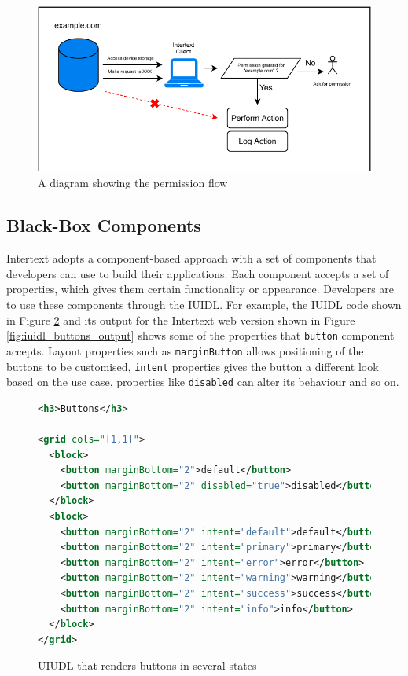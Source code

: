 \begin{figure}
  \centering
  \includegraphics[width=13cm]{thesis/paper/images/permission.pdf}
  \caption{A diagram showing the permission flow}%
  \label{fig:permission_flow}%
\end{figure}


\subsection{Black-Box Components}

Intertext adopts a component-based approach with a set of components that developers can use to build their applications. Each component accepts a set of properties, which gives them certain functionality or appearance. Developers are to use these components through the IUIDL. For example, the IUIDL code shown in Figure \ref{fig:iuidl_buttons} and its output for the Intertext web version shown in Figure \ref{fig:iuidl_buttons_output} shows some of the properties that \texttt{button} component accepts. Layout properties such as  \texttt{marginButton} allows positioning of the buttons to be customised, \texttt{intent} properties gives the button a different look based on the use case, properties like \texttt{disabled} can alter its behaviour and so on.

\begin{figure}
\begin{minipage}{\linewidth}
\begin{lstlisting}[language=xml]
<h3>Buttons</h3>

<grid cols="[1,1]">
  <block>
    <button marginBottom="2">default</button>
    <button marginBottom="2" disabled="true">disabled</button>
  </block>
  <block>
    <button marginBottom="2" intent="default">default</button>
    <button marginBottom="2" intent="primary">primary</button>
    <button marginBottom="2" intent="error">error</button>
    <button marginBottom="2" intent="warning">warning</button>
    <button marginBottom="2" intent="success">success</button>
    <button marginBottom="2" intent="info">info</button>
  </block>
</grid>
\end{lstlisting}
\end{minipage}
\caption{UIUDL that renders buttons in several states}%
\label{fig:iuidl_buttons}%
\end{figure}


